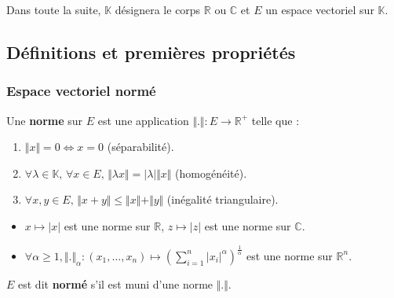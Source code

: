 




	Dans toute la suite, $\mathbb{K}$ désignera le corps $\mathbb{R}$ ou $\mathbb{C}$ et $E$ un espace vectoriel sur $\mathbb{K}$.

	\subsection{Définitions et premières propriétés}

	\subsubsection{Espace vectoriel normé}


	\begin{definition}
		Une \textbf{norme} sur $E$ est une application $\Vert . \Vert : E \rightarrow \mathbb{R}^+$ telle que :
		\begin{enumerate}[label=(\roman*)]
			\item $\Vert x \Vert = 0 \iff x = 0$ (séparabilité).
			\item $\forall \lambda \in \mathbb{K}, \, \forall x \in E, \, \Vert \lambda x \Vert = \vert \lambda \vert \Vert x \Vert$ (homogénéité).
			\item $\forall x, y \in E, \, \Vert x + y \Vert \leq \Vert x \Vert + \Vert y \Vert$ (inégalité triangulaire).
		\end{enumerate}
	\end{definition}

	\begin{example}
		\label{208-1}
		\begin{itemize}
			\item $x \mapsto \vert x \vert$ est une norme sur $\mathbb{R}$, $z \mapsto \vert z \vert$ est une norme sur $\mathbb{C}$.
			\item $\forall \alpha \geq 1, \Vert . \Vert_\alpha : (x_1, \dots, x_n) \mapsto \left(\sum_{i=1}^n \vert x_i \vert^\alpha\right)^{\frac{1}{\alpha}}$ est une norme sur $\mathbb{R}^n$.
		\end{itemize}
	\end{example}

	\reference{47}

	\begin{definition}
		$E$ est dit \textbf{normé} s'il est muni d'une norme $\Vert . \Vert$.
	\end{definition}

